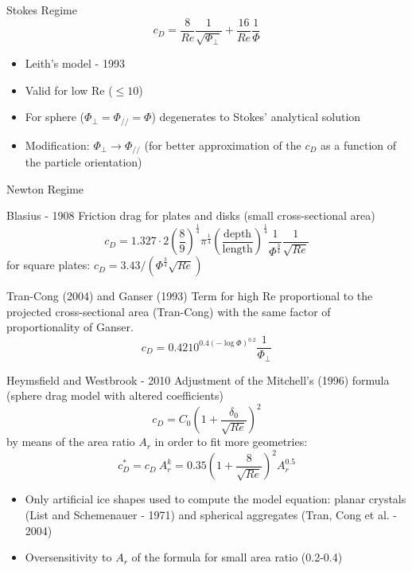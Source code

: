 \documentclass[11pt]{beamer}
\begin{document}
	\begin{frame}{Stokes Regime}
		\begin{equation*}
			c_D = \frac{8}{Re} \frac{1}{\sqrt{\Phi_{\perp}}} + \frac{16}{Re} \frac{1}{\Phi}
		\end{equation*}
		\vfill
		\begin{itemize}
			\item Leith's model - 1993
			\item Valid for low Re ($\leq 10$)
			\item For sphere ($ \Phi_{\perp} = \Phi_{/\!/} = \Phi $) degenerates to Stokes' analytical solution
			\item Modification: $ \Phi_{\perp} \rightarrow \Phi_{/\!/} $   (for better approximation of the $ c_D $ as a function of the particle orientation)
		\end{itemize}
	\end{frame}

	\begin{frame}{Newton Regime}
		\begin{block}{Blasius - 1908}
			Friction drag for plates and disks (small cross-sectional area)
			\begin{equation*}
				c_D = 1.327 \cdot 2 \left(\frac{8}{9}\right)^{\frac{1}{4}} \pi^{\frac{1}{4}} \left(\frac{\text{depth}}{\text{length}}\right)^{\frac{1}{4}} \frac{1}{\Phi^{\frac{3}{4}}} \frac{1}{\sqrt{Re}}
			\end{equation*}
			for square plates: \quad $ c_D = 3.43 / (\Phi^{\frac{3}{4}} \sqrt{Re}) $
		\end{block}
	
		\begin{block}{Tran-Cong (2004) and Ganser (1993)}
			Term for high Re proportional to the projected cross-sectional area (Tran-Cong) with the same factor of proportionality of Ganser.
			\begin{equation*}
				c_D = 0.4210^{0.4(-\log \Phi)^{0.2}} \frac{1}{\Phi_{\perp}}
			\end{equation*}
		\end{block}
	\end{frame}

	\begin{frame}{Heymsfield and Westbrook - 2010}
		Adjustment of the Mitchell's (1996) formula (sphere drag model with altered coefficients)
		\begin{equation*}
			c_D = C_0 \left( 1 + \frac{\delta_0}{\sqrt{Re}} \right)^2
		\end{equation*}
		by means of the area ratio $ A_r $ in order to fit more geometries:
		\begin{equation*}
			c_D^* = c_D \ A_r^k = 0.35 \left( 1 + \frac{8}{\sqrt{Re}} \right)^2 A_r^{0.5}
		\end{equation*}
		\begin{itemize}
			\item Only artificial ice shapes used to compute the model equation: planar crystals (List and Schemenauer - 1971) and spherical aggregates (Tran, Cong et al. - 2004)
			\item Oversensitivity to $ A_r $ of the formula for small area ratio (0.2-0.4)
		\end{itemize}
	\end{frame}
	
\end{document}
